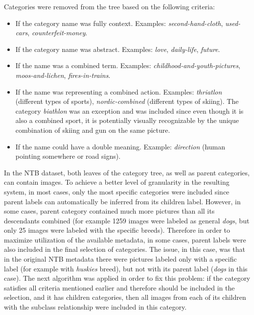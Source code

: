     Categories were removed from the tree based on the following criteria:
    \begin{itemize}
        \item If the category name was fully context. Examples: \textit{second-hand-cloth}, \textit{used-cars}, \textit{counterfeit-money}.
        \item If the category name was abstract. Examples: \textit{love}, \textit{daily-life}, \textit{future}.
        \item If the name was a combined term. Examples: \textit{childhood-and-youth-pictures}, \textit{moos-and-lichen}, \textit{fires-in-trains}. %
        \item If the name was representing a combined action. Examples: \textit{thriatlon} (different types of sports), \textit{nordic-combined} (different types of skiing). The category \textit{biathlon} was an exception and was included since even though it is also a combined sport, it is potentially visually recognizable by the unique combination of skiing and gun on the same picture.
        \item If the name could have a double meaning. Example: \textit{direction} (human pointing somewhere or road signs).
    \end{itemize}
    
    In the NTB dataset, both leaves of the category tree, as well as parent categories, can contain images. To achieve a better level of granularity in the resulting system, in most cases, only the most specific categories were included since parent labels can automatically be inferred from its children label. However, in some cases, parent category contained much more pictures than all its descendants combined (for example 1259 images were labeled as general \textit{dogs}, but only 25 images were labeled with the specific breeds). Therefore in order to maximize utilization of the available metadata, in some cases, parent labels were also included in the final selection of categories. The issue, in this case, was that in the original NTB metadata there were pictures labeled only with a specific label (for example with \textit{huskies} breed), but not with its parent label (\textit{dogs} in this case). The next algorithm was applied in order to fix this problem: if the category satisfies all criteria mentioned earlier and therefore should be included in the selection, and it has children categories, then all images from each of its children with the subclass relationship were included in this category.
    
